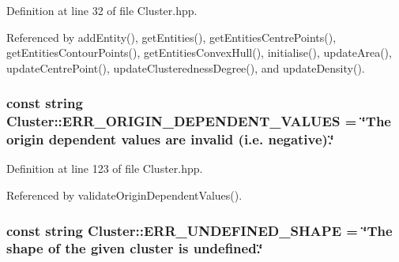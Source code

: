 \-Definition at line 32 of file \-Cluster.\-hpp.



\-Referenced by add\-Entity(), get\-Entities(), get\-Entities\-Centre\-Points(), get\-Entities\-Contour\-Points(), get\-Entities\-Convex\-Hull(), initialise(), update\-Area(), update\-Centre\-Point(), update\-Clusteredness\-Degree(), and update\-Density().

\hypertarget{classmultiscale_1_1analysis_1_1Cluster_a0fa38fcc3f00730409400578829cddd8}{
\subsubsection[{\-E\-R\-R\-\_\-\-O\-R\-I\-G\-I\-N\-\_\-\-D\-E\-P\-E\-N\-D\-E\-N\-T\-\_\-\-V\-A\-L\-U\-E\-S}]{\setlength{\rightskip}{0pt plus 5cm}const string {\bf \-Cluster\-::\-E\-R\-R\-\_\-\-O\-R\-I\-G\-I\-N\-\_\-\-D\-E\-P\-E\-N\-D\-E\-N\-T\-\_\-\-V\-A\-L\-U\-E\-S} = \char`\"{}\-The origin dependent values are invalid (i.\-e. negative).\char`\"{}}}\label{classmultiscale_1_1analysis_1_1Cluster_a0fa38fcc3f00730409400578829cddd8}


\-Definition at line 123 of file \-Cluster.\-hpp.



\-Referenced by validate\-Origin\-Dependent\-Values().

\hypertarget{classmultiscale_1_1analysis_1_1Cluster_a546b8e93e3f1ef51a9932f8599639070}{
\subsubsection[{\-E\-R\-R\-\_\-\-U\-N\-D\-E\-F\-I\-N\-E\-D\-\_\-\-S\-H\-A\-P\-E}]{\setlength{\rightskip}{0pt plus 5cm}const string {\bf \-Cluster\-::\-E\-R\-R\-\_\-\-U\-N\-D\-E\-F\-I\-N\-E\-D\-\_\-\-S\-H\-A\-P\-E} = \char`\"{}\-The {\bf shape} of the given cluster is undefined.\char`\"{}}}\label{classmultiscale_1_1analysis_1_1Cluster_a546b8e93e3f1ef51a9932f8599639070}


